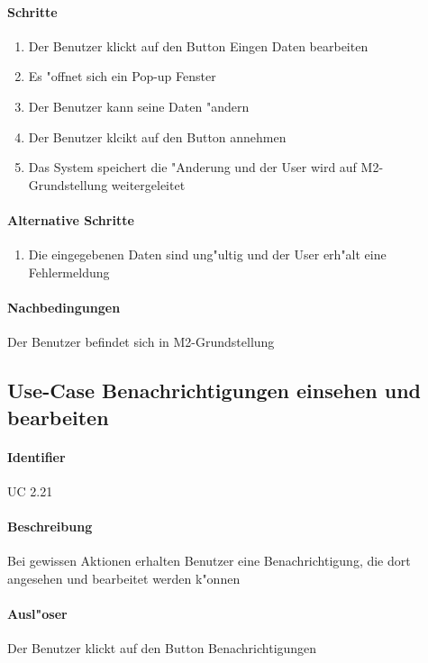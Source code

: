   \paragraph{Schritte}
  \begin{enumerate}
   \item Der Benutzer klickt auf den Button \dq Eingen Daten bearbeiten\dq
   \item Es "offnet sich ein Pop-up Fenster
   \item Der Benutzer kann seine Daten "andern
   \item Der Benutzer klcikt auf den Button \dq annehmen\dq
   \item Das System speichert die "Anderung und der User wird auf M2-Grundstellung weitergeleitet
  \end{enumerate}

  \paragraph{Alternative Schritte}
  \begin{enumerate}
   \item Die eingegebenen Daten sind ung"ultig und der User erh"alt eine Fehlermeldung
  \end{enumerate}

  \paragraph{Nachbedingungen}
  Der Benutzer befindet sich in M2-Grundstellung

  
  \newpage
 \subsection{Use-Case Benachrichtigungen einsehen und bearbeiten}
  \paragraph{Identifier}
  UC 2.21
  \paragraph{Beschreibung}
  Bei gewissen Aktionen erhalten Benutzer eine Benachrichtigung, die dort angesehen und bearbeitet werden k"onnen
  \paragraph{Ausl"oser}
  Der Benutzer klickt auf den Button \dq Benachrichtigungen\dq
